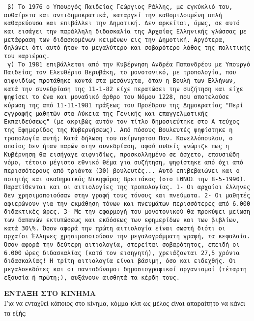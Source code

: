 \documentclass[a4paper]{article}
\begin{document}
\begin{verbatim}
 β) Το 1976 ο Υπουργός Παιδείας Γεώργιος Ράλλης, με εγκύκλιό του, αυθαίρετα και αντιδημοκρατικά, καταργεί την καθομιλουμένη απλή καθαρεύουσα και επιβάλλει την Δημοτική. Δεν αρκείται, όμως, σε αυτό και εισάγει την παράλληλη διδασκαλία της Αρχαίας Ελληνικής γλώσσας με μετάφραση των διδασκομένων κειμένων εις την Δημοτική. Αργότερα, δηλώνει ότι αυτό ήταν το μεγαλύτερο και σοβαρότερο λάθος της πολιτικής του καριέρας. 
 γ) Το 1981 επιβάλλεται από την Κυβέρνηση Ανδρέα Παπανδρέου με Υπουργό Παιδείας τον Ελευθέριο Βερυβάκη, το μονοτονικό, με τροπολογία, που αιφνιδίως προτάθηκε κοντά στα μεσάνυχτα, όταν η Βουλή των Ελλήνων, κατά την συνεδρίαση της 11-1-82 είχε περατώσει την συζήτηση και είχε ψηφίσει το ένα και μοναδικό άρθρο του Νόμου 1228, που αποτελούσε κύρωση της από 11-11-1981 πράξεως του Προέδρου της Δημοκρατίας "Περί εγγραφής μαθητών στα Λύκεια της Γενικής και επαγγελματικής Εκπαιδεύσεως" (με ακριβώς αυτόν τον τίτλο δημοσιεύτηκε στο Α τεύχος της Εφημερίδος της Κυβερνήσεως). Από πόσους Βουλευτές ψηφίστηκε η τροπολογία αυτή; Κατά δήλωση του αείμνηστου Παν. Κανελλόπουλου, ο οποίος δεν ήταν παρών στην συνεδρίαση, αφού ουδείς γνώριζε πως η Κυβέρνηση θα εισήγαγε αιφνιδίως, προσκολλημένο σε άσχετο, επουσιώδη νόμο, τέτοιο μέγιστο εθνικό θέμα για συζήτηση, ψηφίστηκε από όχι από περισσότερους από τριάντα (30) βουλευτές... Αυτό επιβεβαιώνει και ο ποιητής και ακαδημαϊκός Νικηφόρος Βρεττάκος (στο ΕΘΝΟΣ την 8-5-1990). Παρατίθενται και οι αιτιολογίες της τροπολογίας. 1- Οι αρχαίοι έλληνες δεν χρησιμοποιούσαν στην γραφή τους τόνους και πνεύματα. 2- Οι μαθητές αφιερώνουν για την εκμάθηση τόνων και πνευμάτων περισσότερες από 6.000 διδακτικές ώρες. 3- Με την εφαρμογή του μονοτονικού θα προκύψει μείωση των δαπανών εκτυπώσεως και εκδόσεως των εφημερίδων και των βιβλίων, κατά 30\%. Όσον αφορά την πρώτη αιτιολογία είναι σωστή διότι οι αρχαίοι Έλληνες χρησιμοποιούσαν την μεγαλογράμματη γραφή, τα κεφαλαία. Όσον αφορά την δεύτερη αιτιολογία, στερείται σοβαρότητος, επειδή οι 6.000 ώρες διδασκαλίας (κατά τον εισηγητή), χρειάζονται 27,5 χρόνια διδασκαλίας! Η τρίτη αιτιολογία είναι βάσιμη, όσο και ειδεχθής. Οι μεγαλοεκδότες και οι παντοδύναμοι δημοσιογραφικοί οργανισμοί (τέταρτη εξουσία ή πρώτη;), αυξάνουν αισθητά τα κέρδη τους. 
\end{verbatim}

\textbf{ΕΝΤΑΞΗ ΣΤΟ ΚΙΝΗΜΑ}\\Για να ενταχθεί κάποιος στο κίνημα, κόμμα κλπ ως μέλος είναι απαραίτητο να κάνει τα εξής:
\end{document}
